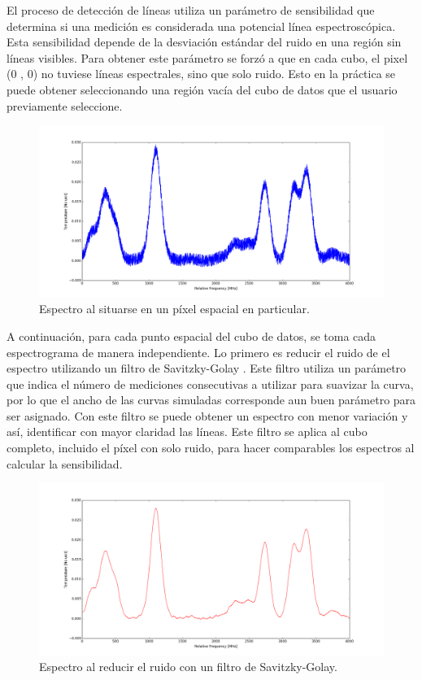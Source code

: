 El proceso de detección de líneas utiliza un parámetro de sensibilidad que determina si una medición es considerada una potencial línea espectroscópica. Esta sensibilidad depende de la desviación estándar del ruido en una región sin líneas visibles. Para obtener este parámetro se forzó a que en cada cubo, el pixel (0 , 0) no tuviese líneas espectrales, sino que solo ruido. Esto en la práctica se puede obtener seleccionando una región vacía del cubo de datos que el usuario previamente seleccione.

\begin{figure}[H]
	\begin{center}
		\includegraphics[width=140mm]{images/fig2}
		\caption{Espectro al situarse en un píxel espacial en particular. }
	\end{center}
\end{figure}

A continuación, para cada punto espacial del cubo de datos, se toma cada espectrograma de manera independiente. Lo primero es reducir el ruido de el espectro utilizando un filtro de Savitzky-Golay \cite{howley_effect_2005}. Este filtro utiliza un parámetro que indica el número de mediciones consecutivas a utilizar para suavizar la curva, por lo que el ancho de las curvas simuladas corresponde aun buen parámetro para ser asignado. Con este filtro se puede obtener un espectro con menor variación y así, identificar con mayor claridad las líneas. Este filtro se aplica al cubo completo, incluido el píxel con solo ruido, para hacer comparables los espectros al calcular la sensibilidad.

\begin{figure}[H]
	\begin{center}
		\includegraphics[width=140mm]{images/fig3}
		\caption{Espectro al reducir el ruido con un filtro de Savitzky-Golay. }
	\end{center}
\end{figure}


